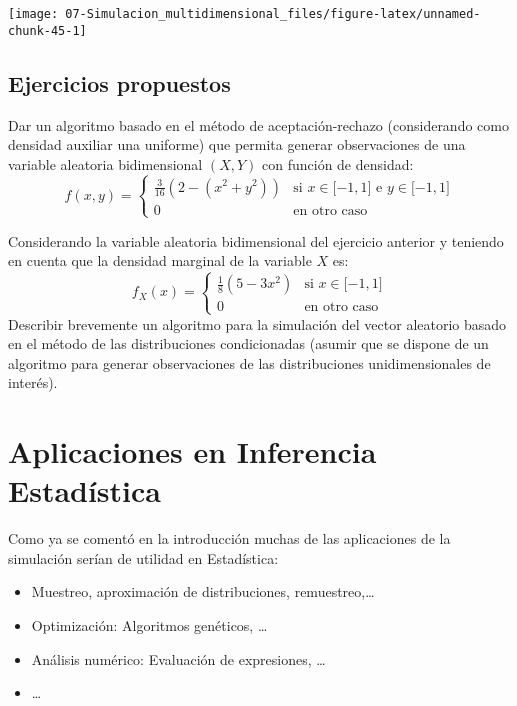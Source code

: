 \documentclass[
]{book}
\theoremstyle{break}
\theoremstyle{definition}
\theoremstyle{definition}
\theoremstyle{definition}
\theoremstyle{remark}
\let\BeginKnitrBlock\begin \let\EndKnitrBlock\end
\begin{document}
\begin{center}\texttt{[image: 07-Simulacion\_multidimensional\_files/figure-latex/unnamed-chunk-45-1]} \end{center}

\hypertarget{ejercicios-propuestos}{%
\section{Ejercicios propuestos}\label{ejercicios-propuestos}}

\BeginKnitrBlock{exercise}
\protect\hypertarget{exr:ar2d}{}{\label{exr:ar2d} }
\EndKnitrBlock{exercise}

Dar un algoritmo basado en el método de aceptación-rechazo
(considerando como densidad auxiliar una uniforme) que permita
generar observaciones de una variable aleatoria bidimensional
\(\left( X,Y\right)\) con función de densidad:
\[f(x,y)=\left\{ 
\begin{array}{cl}
\frac{3}{16}\left( 2-\left( x^2+y^2\right) \right)  & \text{si }x\in
\lbrack -1,1]\text{ e }y\in \lbrack -1,1] \\ 
0 & \text{en otro caso}
\end{array}
\right.\]

\BeginKnitrBlock{exercise}
\protect\hypertarget{exr:cond2d}{}{\label{exr:cond2d} }
\EndKnitrBlock{exercise}

Considerando la variable aleatoria bidimensional del ejercicio
anterior y teniendo en cuenta que la densidad marginal de la
variable \(X\) es:
\[f_{X}(x)=\left\{ 
\begin{array}{cl}
\frac{1}{8}\left( 5-3x^2\right)  & \text{si }x\in \lbrack -1,1] \\ 
0 & \text{en otro caso}
\end{array}
\right.\]
Describir brevemente un algoritmo para la simulación del
vector aleatorio basado en el método de las distribuciones
condicionadas (asumir que se dispone de un algoritmo para generar
observaciones de las distribuciones unidimensionales de interés).

\hypertarget{cap8}{%
\chapter{Aplicaciones en Inferencia Estadística}\label{cap8}}

Como ya se comentó en la introducción muchas de las aplicaciones de la simulación serían de utilidad en Estadística:

\begin{itemize}
\item
  Muestreo, aproximación de distribuciones,
  remuestreo,\ldots{}
\item
  Optimización: Algoritmos genéticos, \ldots{}
\item
  Análisis numérico: Evaluación de expresiones, \ldots{}
\item
  \ldots{}
\end{itemize}
\end{document}
